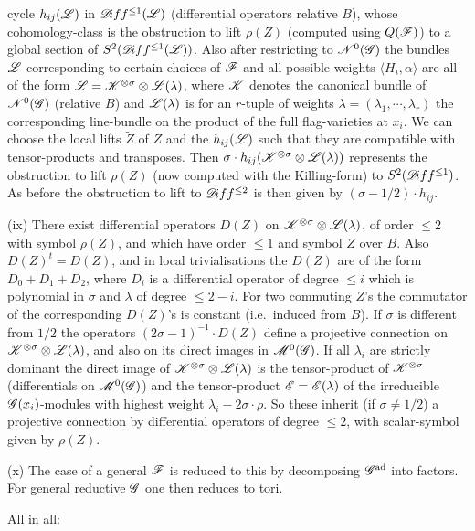 \documentclass[12pt,english]{smfart}
\theoremstyle{plain} \newtheorem{innerthm}{Theorem} \newtheorem{innerlem}{Lemma} \newtheorem{innerprop}{Proposition} \newtheorem{innercor}{Corollary} \theoremstyle{definition} \newtheorem{innerdefn}{Definition} \newtheorem{innerconstr}{Construction} \theoremstyle{remark} \newtheorem*{remark}{Remark} \newtheorem*{remarks}{Remarks} \newtheorem*{applications}{Applications}
\begin{document}

cycle $h_{ij}(\mathscr{L})$ in $\mathscr{D}\!iff^{\le 1}(\mathscr{L})$ (differential operators relative $B$), whose cohomology-class is the obstruction to lift $\rho(Z)$ (computed using $Q(\mathscr{F})$) to a global section of $S^2(\mathscr{D}\!iff^{\le 1}(\mathscr{L}))$. Also after restricting to $\mathscr{N}^0(\mathscr{G})$ the bundles $\mathscr{L}$ corresponding to certain choices of $\mathscr{F}$ and all possible weights $\langle H_i,\alpha\rangle$ are all of the form $\mathscr{L}=\mathscr{K}^{\otimes\sigma}\otimes\mathscr{L}(\lambda)$, where $\mathscr{K}$ denotes the canonical bundle of $\mathscr{N}^0(\mathscr{G})$ (relative $B$) and $\mathscr{L}(\lambda)$ is for an $r$-tuple of weights $\lambda=(\lambda_1,\cdots,\lambda_r)$ the corresponding line-bundle on the product of the full flag-varieties at $x_i$. We can choose the local lifts $\widetilde{Z}$ of $Z$ and the $h_{ij}(\mathscr{L})$ such that they are compatible with tensor-products and transposes. Then $\sigma\cdot h_{ij}(\mathscr{K}^{\otimes\sigma}\otimes\mathscr{L}(\lambda))$ represents the obstruction to lift $\rho(Z)$ (now computed with the Killing-form) to $S^2(\mathscr{D}\!iff^{\le 1})$. As before the obstruction to lift to $\mathscr{D}\!iff^{\le 2}$ is then given by $(\sigma-1/2)\cdot h_{ij}$.

(ix) There exist differential operators $D(Z)$ on $\mathscr{K}^{\otimes\sigma}\otimes\mathscr{L}(\lambda)$, of order $\le 2$ with symbol $\rho(Z)$, and which have order $\le 1$ and symbol $Z$ over $B$. Also $D(Z)^t=D(Z)$, and in local trivialisations the $D(Z)$ are of the form $D_0+D_1+D_2$, where $D_i$ is a differential operator of degree $\le i$ which is polynomial in $\sigma$ and $\lambda$ of degree $\le 2-i$. For two commuting $Z$'s the commutator of the corresponding $D(Z)$'s is constant (i.e.\ induced from $B$). If $\sigma$ is different from $1/2$ the operators $(2\sigma-1)^{-1}\cdot D(Z)$ define a projective connection on $\mathscr{K}^{\otimes\sigma}\otimes\mathscr{L}(\lambda)$, and also on its direct images in $\mathscr{M}^0(\mathscr{G})$. If all $\lambda_i$ are strictly dominant the direct image of $\mathscr{K}^{\otimes\sigma}\otimes\mathscr{L}(\lambda)$ is the tensor-product of $\mathscr{K}^{\otimes\sigma}$ (differentials on $\mathscr{M}^0(\mathscr{G})$) and the tensor-product $\mathscr{E}=\mathscr{E}(\lambda)$ of the irreducible $\mathscr{G}(x_i)$-modules with highest weight $\lambda_i-2\sigma\cdot\rho$. So these inherit (if $\sigma\ne1/2$) a projective connection by differential operators of degree $\le2$, with scalar-symbol given by $\rho(Z)$.

(x) The case of a general $\mathscr{F}$ is reduced to this by decomposing $\mathscr{G}^{\mathrm{ad}}$ into factors. For general reductive $\mathscr{G}$ one then reduces to tori.

All in all:
\end{document}
